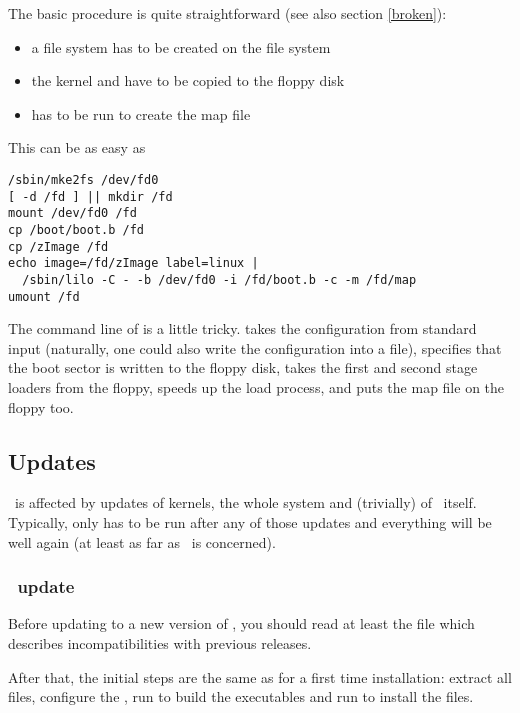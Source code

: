 The basic procedure is quite straightforward (see also section \ref{broken}):
\begin{itemize}
  \item a file system has to be created on the file system
  \item the kernel and  have to be copied to the floppy disk
  \item {} has to be run to create the map file
\end{itemize}

This can be as easy as
\begin{verbatim}
/sbin/mke2fs /dev/fd0
[ -d /fd ] || mkdir /fd
mount /dev/fd0 /fd
cp /boot/boot.b /fd
cp /zImage /fd
echo image=/fd/zImage label=linux |
  /sbin/lilo -C - -b /dev/fd0 -i /fd/boot.b -c -m /fd/map
umount /fd
\end{verbatim}

The command line of  is a little tricky.  takes
the configuration from standard input (naturally, one could also write the
configuration into a file),  specifies that the boot sector
is written to the floppy disk,  takes the first and second
stage loaders from the floppy,  speeds up the load process, and
 puts the map file on the floppy too.


\subsection{Updates}

\LILO\ is affected by updates of kernels, the whole system and (trivially)
of \LILO\ itself. Typically, only  has to be run after
any of those updates and everything will be well again (at least as far
as \LILO\ is concerned).


\subsubsection{\LILO\ update}
\label{liloupd}

Before updating to a new version of \LILO, you should read at least the 
file  which describes incompatibilities with previous
releases.

After that, the initial steps are the same as
for a first time installation: extract all files, configure the ,
run  to build
the executables and run  to install the files.

